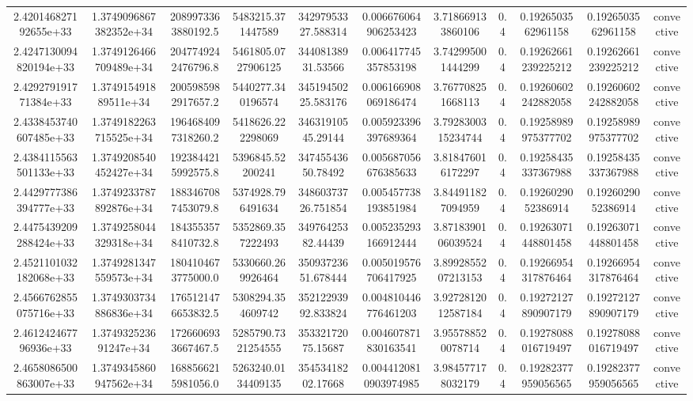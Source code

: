 \begin{table}
\begin{tabular}{ccccccccccc}
2.420146827192655e+33 & 1.3749096867382352e+34 & 2089973363880192.5 & 5483215.371447589 & 34297953327.588314 & 0.006676064906253423 & 3.718669133860106 & 0.4 & 0.1926503562961158 & 0.1926503562961158 & convective \\
2.4247130094820194e+33 & 1.3749126466709489e+34 & 2047749242476796.8 & 5461805.0727906125 & 34408138931.53566 & 0.006417745357853198 & 3.742995001444299 & 0.4 & 0.19262661239225212 & 0.19262661239225212 & convective \\
2.429279191771384e+33 & 1.374915491889511e+34 & 2005985982917657.2 & 5440277.340196574 & 34519450225.583176 & 0.006166908069186474 & 3.767708251668113 & 0.4 & 0.19260602242882058 & 0.19260602242882058 & convective \\
2.4338453740607485e+33 & 1.3749182263715525e+34 & 1964684097318260.2 & 5418626.222298069 & 34631910545.29144 & 0.005923396397689364 & 3.7928300315234744 & 0.4 & 0.19258989975377702 & 0.19258989975377702 & convective \\
2.4384115563501133e+33 & 1.3749208540452427e+34 & 1923844215992575.8 & 5396845.52200241 & 34745543650.78492 & 0.005687056676385633 & 3.818476016172297 & 0.4 & 0.19258435337367988 & 0.19258435337367988 & convective \\
2.4429777386394777e+33 & 1.3749233787892876e+34 & 1883467087453079.8 & 5374928.796491634 & 34860373726.751854 & 0.005457738193851984 & 3.844911827094959 & 0.4 & 0.1926029052386914 & 0.1926029052386914 & convective \\
2.4475439209288424e+33 & 1.3749258044329318e+34 & 1843553578410732.8 & 5352869.357222493 & 34976425382.44439 & 0.005235293166912444 & 3.8718390106039524 & 0.4 & 0.19263071448801458 & 0.19263071448801458 & convective \\
2.4521101032182068e+33 & 1.3749281347559573e+34 & 1804104673775000.0 & 5330660.269926464 & 35093723651.678444 & 0.005019576706417925 & 3.8992855207213153 & 0.4 & 0.19266954317876464 & 0.19266954317876464 & convective \\
2.4566762855075716e+33 & 1.3749303734886836e+34 & 1765121476653832.5 & 5308294.354609742 & 35212293992.833824 & 0.004810446776461203 & 3.9272812012587184 & 0.4 & 0.19272127890907179 & 0.19272127890907179 & convective \\
2.461242467796936e+33 & 1.374932523691247e+34 & 1726606933667467.5 & 5285790.7321254555 & 35332172075.15687 & 0.004607871830163541 & 3.955788520078714 & 0.4 & 0.19278088016719497 & 0.19278088016719497 & convective \\
2.4658086500863007e+33 & 1.3749345860947562e+34 & 1688566215981056.0 & 5263240.0134409135 & 35453418202.17668 & 0.0044120810903974985 & 3.984577178032179 & 0.4 & 0.19282377959056565 & 0.19282377959056565 & convective \\

\end{tabular}
\end{table}
